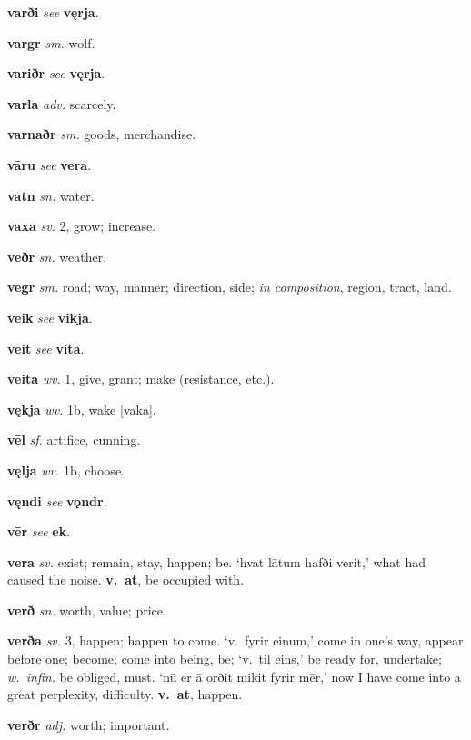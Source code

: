 \documentclass[12pt,letterpaper]{book}
\begin{document}
\noindent
\textbf{varði} \textit{} \textit{see} \textbf{vęrja}.

\noindent
\textbf{vargr} \textit{sm.} wolf.

\noindent
\textbf{variðr} \textit{} \textit{see} \textbf{vęrja}.

\noindent
\textbf{varla} \textit{adv.} scarcely.

\noindent
\textbf{varnaðr} \textit{sm.} goods, merchandise.

\noindent
\textbf{vāru} \textit{} \textit{see} \textbf{vera}.

\noindent
\textbf{vatn} \textit{sn.} water.

\noindent
\textbf{vaxa} \textit{sv.} 2, grow; increase.

\noindent
\textbf{veðr} \textit{sn.} weather.

\noindent
\textbf{vegr} \textit{sm.} road; way, manner; direction, side;
	\textit{in composition}, region, tract, land.

\noindent
\textbf{veik} \textit{} \textit{see} \textbf{vikja}.

\noindent
\textbf{veit} \textit{} \textit{see} \textbf{vita}.

\noindent
\textbf{veita} \textit{wv.} 1, give, grant; make (resistance, etc.).

\noindent
\textbf{vękja} \textit{wv.} 1b, wake [vaka].

\noindent
\textbf{vēl} \textit{sf.} artifice, cunning.

\noindent
\textbf{vęlja} \textit{wv.} 1b, choose.

\noindent
\textbf{vęndi} \textit{} \textit{see} \textbf{vǫndr}.

\noindent
\textbf{vēr} \textit{} \textit{see} \textbf{ek}.

\noindent
\textbf{vera} \textit{sv.} exist; remain, stay, happen; be.  `hvat
	lātum hafði verit,' what had caused the noise.  \textbf{v.\ at}, be
	occupied with.

\noindent
\textbf{verð} \textit{sn.} worth, value; price.

\noindent
\textbf{verða} \textit{sv.} 3, happen; happen to come.  `v.\ fyrir
	einum,' come in one's way, appear before one; become; come into
	being, be; `v.\ til eins,' be ready for, undertake; \textit{w.\ infin.}
	be obliged, must.  `nū er ā orðit mikit fyrir mēr,' now I have
    come into a great perplexity, difficulty.  \textbf{v.\ at}, happen.

\noindent
\textbf{verðr} \textit{adj.} worth; important.
\end{document}

